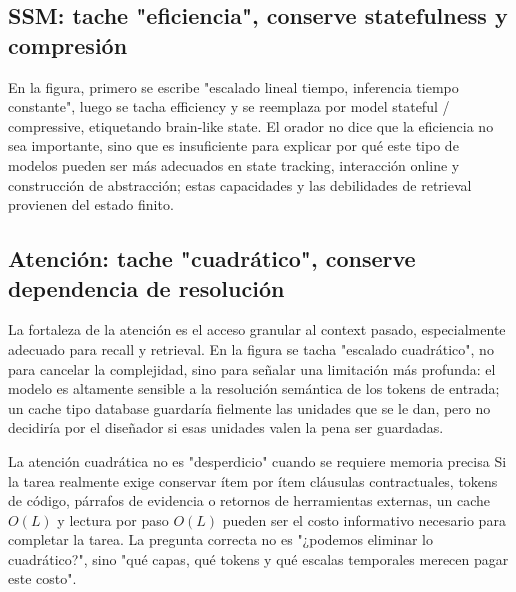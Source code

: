 \subsection{SSM: tache "eficiencia", conserve statefulness y compresión}

En la figura, primero se escribe "escalado lineal tiempo, inferencia tiempo constante", luego se tacha efficiency y se reemplaza por model stateful / compressive, etiquetando brain-like state. El orador no dice que la eficiencia no sea importante, sino que es insuficiente para explicar por qué este tipo de modelos pueden ser más adecuados en state tracking, interacción online y construcción de abstracción; estas capacidades y las debilidades de retrieval provienen del estado finito.



\subsection{Atención: tache "cuadrático", conserve dependencia de resolución}

La fortaleza de la atención es el acceso granular al context pasado, especialmente adecuado para recall y retrieval. En la figura se tacha "escalado cuadrático", no para cancelar la complejidad, sino para señalar una limitación más profunda: el modelo es altamente sensible a la resolución semántica de los tokens de entrada; un cache tipo database guardaría fielmente las unidades que se le dan, pero no decidiría por el diseñador si esas unidades valen la pena ser guardadas.


\begin{warningbox}{La atención cuadrática no es "desperdicio" cuando se requiere memoria precisa}
Si la tarea realmente exige conservar ítem por ítem cláusulas contractuales, tokens de código, párrafos de evidencia o retornos de herramientas externas, un cache $O(L)$ y lectura por paso $O(L)$ pueden ser el costo informativo necesario para completar la tarea. La pregunta correcta no es "¿podemos eliminar lo cuadrático?", sino "qué capas, qué tokens y qué escalas temporales merecen pagar este costo".
\end{warningbox}

